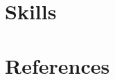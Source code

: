 \documentclass[a4paper]{article}
\begin{document}
            
            \section*{Skills}
            
            \section*{References}
            
        
\end{document}
